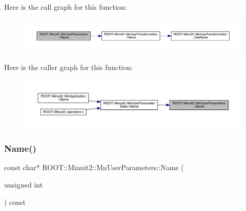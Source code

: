 Here is the call graph for this function\+:
\nopagebreak
\begin{figure}[H]
\begin{center}
\leavevmode
\includegraphics[width=350pt]{d6/d10/classROOT_1_1Minuit2_1_1MnUserParameters_a1228bfaf2fd8b6f27ac5c302644e5120_cgraph}
\end{center}
\end{figure}
Here is the caller graph for this function\+:
\nopagebreak
\begin{figure}[H]
\begin{center}
\leavevmode
\includegraphics[width=350pt]{d6/d10/classROOT_1_1Minuit2_1_1MnUserParameters_a1228bfaf2fd8b6f27ac5c302644e5120_icgraph}
\end{center}
\end{figure}
\mbox{\label{classROOT_1_1Minuit2_1_1MnUserParameters_a9606a3e37135ef1f08c2fe57036d07eb}} 
\subsubsection{\texorpdfstring{Name()}{Name()}\hspace{0.1cm}{\footnotesize\ttfamily [2/3]}}
{\footnotesize\ttfamily const char$\ast$ R\+O\+O\+T\+::\+Minuit2\+::\+Mn\+User\+Parameters\+::\+Name (\begin{DoxyParamCaption}\item[{unsigned int}]{ }\end{DoxyParamCaption}) const}

\mbox{\label{classROOT_1_1Minuit2_1_1MnUserParameters_a9606a3e37135ef1f08c2fe57036d07eb}} 
